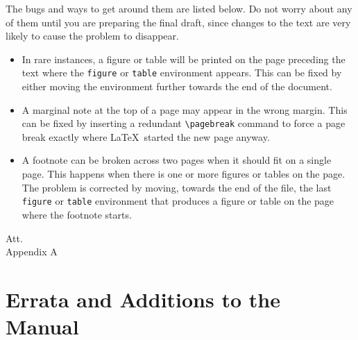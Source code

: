 The bugs and ways to get around them are listed below.  Do not worry
about any of them until you are preparing the final draft, since
changes to the text are very likely to cause the problem to disappear.
\begin{itemize}
\item In rare instances, a figure or table will be printed on the page
preceding the text where the {\tt figure} or {\tt table} environment
appears.  This can be fixed by either moving the environment further
towards the end of the document. 

\item A marginal note at the top of a page may appear in the wrong
margin.  This can be fixed by inserting a redundant \verb|\pagebreak|
command to force a page break exactly where \LaTeX\ started the new
page anyway.

\item A footnote can be broken across two pages when it should fit on a
single page.  This happens when there is one or more figures or tables
on the page.  The problem is corrected by moving, towards the end of the
file, the last {\tt figure} or {\tt table} environment that produces a
figure or table on the page where the footnote starts.
\end{itemize}
{\noindent Att.\\
Appendix A}

\appendices

\section{Errata and Additions to the Manual}


\tableofcontents
\mffcoversheet


